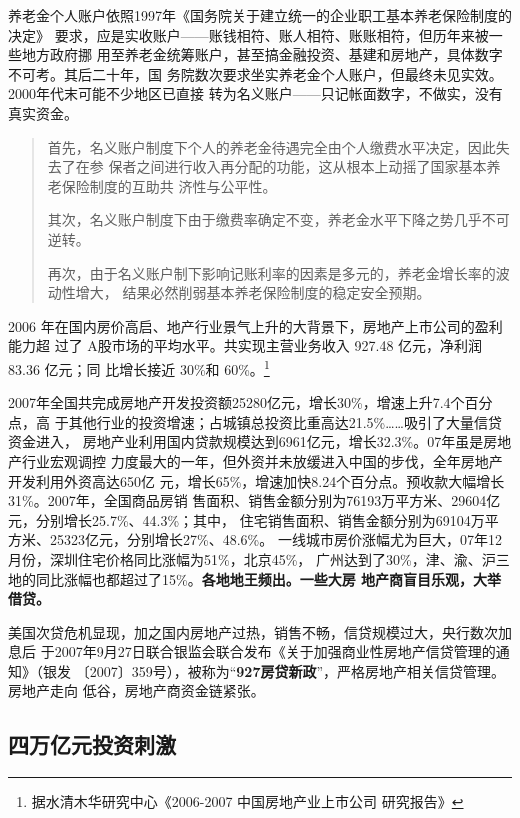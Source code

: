 养老金个人账户依照1997年《国务院关于建立统一的企业职工基本养老保险制度的决定》
要求，应是实收账户——账钱相符、账人相符、账账相符，但历年来被一些地方政府挪
用至养老金统筹账户，甚至搞金融投资、基建和房地产，具体数字不可考。其后二十年，国
务院数次要求坐实养老金个人账户，但最终未见实效。2000年代末可能不少地区已直接
转为名义账户——只记帐面数字，不做实，没有真实资金。
\begin{quotation}
  首先，名义账户制度下个人的养老金待遇完全由个人缴费水平决定，因此失去了在参
  保者之间进行收入再分配的功能，这从根本上动摇了国家基本养老保险制度的互助共
  济性与公平性。

  其次，名义账户制度下由于缴费率确定不变，养老金水平下降之势几乎不可逆转。

  再次，由于名义账户制下影响记账利率的因素是多元的，养老金增长率的波动性增大，
  结果必然削弱基本养老保险制度的稳定安全预期。\cite{mingyizhanghu}
\end{quotation}


2006 年在国内房价高启、地产行业景气上升的大背景下，房地产上市公司的盈利能力超
过了 A股市场的平均水平。共实现主营业务收入 927.48 亿元，净利润 83.36 亿元；同
比增长接近 30\%和 60\%。\footnote{据水清木华研究中心《2006-2007 中国房地产业上市公司
  研究报告》}

2007年全国共完成房地产开发投资额25280亿元，增长30\%，增速上升7.4个百分点，高
于其他行业的投资增速；占城镇总投资比重高达21.5\%……吸引了大量信贷资金进入，
房地产业利用国内贷款规模达到6961亿元，增长32.3\%。07年虽是房地产行业宏观调控
力度最大的一年，但外资并未放缓进入中国的步伐，全年房地产开发利用外资高达650亿
元，增长65\%，增速加快8.24个百分点。预收款大幅增长31\%。2007年，全国商品房销
售面积、销售金额分别为76193万平方米、29604亿元，分别增长25.7\%、44.3\%；其中，
住宅销售面积、销售金额分别为69104万平方米、25323亿元，分别增长27\%、48.6\%。
一线城市房价涨幅尤为巨大，07年12月份，深圳住宅价格同比涨幅为51\%，北京45\%，
广州达到了30\%，津、渝、沪三地的同比涨幅也都超过了15\%。\textbf{各地地王频出。一些大房
地产商盲目乐观，大举借贷。}



美国次贷危机显现，加之国内房地产过热，销售不畅，信贷规模过大，央行数次加息后
于2007年9月27日联合银监会联合发布《关于加强商业性房地产信贷管理的通知》（银发
〔2007〕359号），被称为“\textbf{927房贷新政}”，严格房地产相关信贷管理。房地产走向
低谷，房地产商资金链紧张。


\subsection{四万亿元投资刺激}

